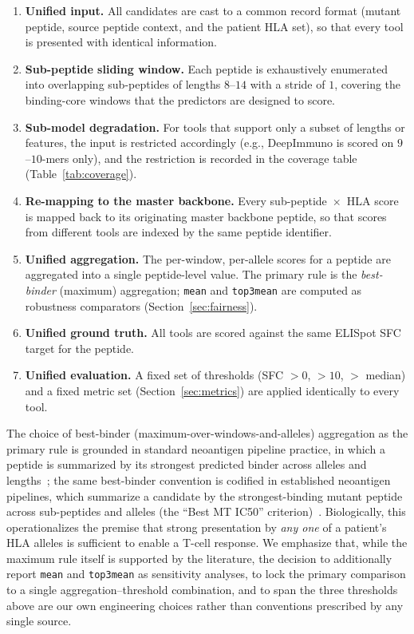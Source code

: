 \begin{enumerate}
  \item \textbf{Unified input.} All candidates are cast to a common record
        format (mutant peptide, source peptide context, and the patient HLA set),
        so that every tool is presented with identical information.
  \item \textbf{Sub-peptide sliding window.} Each peptide is exhaustively
        enumerated into overlapping sub-peptides of lengths $8$--$14$ with a
        stride of $1$, covering the binding-core windows that the predictors
        are designed to score.
  \item \textbf{Sub-model degradation.} For tools that support only a subset of
        lengths or features, the input is restricted accordingly (e.g.,
        DeepImmuno is scored on $9$--$10$-mers only), and the restriction is
        recorded in the coverage table (Table~\ref{tab:coverage}).
  \item \textbf{Re-mapping to the master backbone.} Every sub-peptide~$\times$~HLA
        score is mapped back to its originating master backbone peptide, so that
        scores from different tools are indexed by the same peptide identifier.
  \item \textbf{Unified aggregation.} The per-window, per-allele scores for a
        peptide are aggregated into a single peptide-level value. The primary
        rule is the \emph{best-binder} (maximum) aggregation; \texttt{mean} and
        \texttt{top3mean} are computed as robustness comparators
        (Section~\ref{sec:fairness}).
  \item \textbf{Unified ground truth.} All tools are scored against the same
        ELISpot SFC target for the peptide.
  \item \textbf{Unified evaluation.} A fixed set of thresholds
        (SFC $>0$, $>10$, $>$ median) and a fixed metric set
        (Section~\ref{sec:metrics}) are applied identically to every tool.
\end{enumerate}

The choice of best-binder (maximum-over-windows-and-alleles) aggregation as the
primary rule is grounded in standard neoantigen pipeline practice, in which a
peptide is summarized by its strongest predicted binder across alleles and
lengths~\cite{NetMHCpan2020,PRIME2023}; the same best-binder convention is
codified in established neoantigen pipelines, which summarize a candidate by the
strongest-binding mutant peptide across sub-peptides and alleles (the
``Best MT IC50'' criterion)~\cite{pVACtools2020,pVACseq2016}.
Biologically, this operationalizes the premise that strong presentation by
\emph{any one} of a patient's HLA alleles is sufficient to enable a T-cell
response. We emphasize that, while the maximum rule itself is supported by the
literature, the decision to additionally report \texttt{mean} and
\texttt{top3mean} as sensitivity analyses, to lock the primary comparison to a
single aggregation--threshold combination, and to span the three thresholds
above are our own engineering choices rather than conventions prescribed by any
single source.

